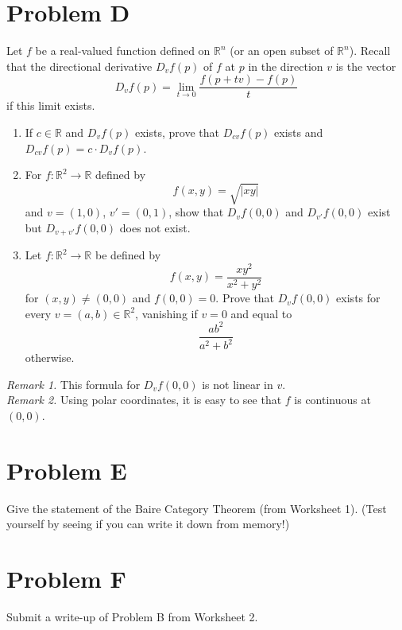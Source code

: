 \documentclass[lang=cn,11pt]{template}
\begin{document}
\section*{Problem D}
Let \( f \) be a real-valued function defined on \( \mathbb{R}^n \) (or an open subset of \( \mathbb{R}^n \)). Recall that the directional derivative \( D_v f(p) \) of \( f \) at \( p \) in the direction \( v \) is the vector
\[
D_v f(p) = \lim_{t \to 0} \frac{f(p + tv) - f(p)}{t}
\]
if this limit exists.
\begin{enumerate}
    \item If \( c \in \mathbb{R} \) and \( D_v f(p) \) exists, prove that \( D_{cv} f(p) \) exists and \( D_{cv} f(p) = c \cdot D_v f(p) \).
    \item For \( f : \mathbb{R}^2 \to \mathbb{R} \) defined by
    \[
    f(x, y) = \sqrt{|xy|}
    \]
    and \( v = (1, 0) \), \( v' = (0, 1) \), show that \( D_v f(0, 0) \) and \( D_{v'} f(0, 0) \) exist but \( D_{v+v'} f(0, 0) \) does not exist.
    \item Let \( f : \mathbb{R}^2 \to \mathbb{R} \) be defined by
    \[
    f(x, y) = \frac{xy^2}{x^2 + y^2}
    \]
    for \( (x, y) \neq (0, 0) \) and \( f(0, 0) = 0 \). Prove that \( D_v f(0, 0) \) exists for every \( v = (a, b) \in \mathbb{R}^2 \), vanishing if \( v = 0 \) and equal to
    \[
    \frac{ab^2}{a^2 + b^2}
    \]
    otherwise.
\end{enumerate}
\textit{Remark 1.} This formula for \( D_v f(0, 0) \) is not linear in \( v \).\\
\textit{Remark 2.} Using polar coordinates, it is easy to see that \( f \) is continuous at \( (0, 0) \).

\section*{Problem E}
Give the statement of the Baire Category Theorem (from Worksheet 1). (Test yourself by seeing if you can write it down from memory!)

\section*{Problem F}
Submit a write-up of Problem B from Worksheet 2.
\end{document}

